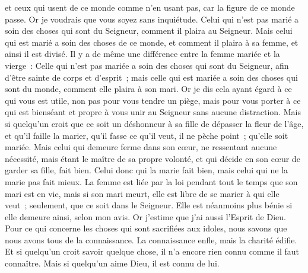 \begin{multicols}{2}
et ceux qui usent de ce monde comme n'en usant pas, car la figure de ce monde passe.
Or je voudrais que vous soyez sans inquiétude. Celui qui n'est pas marié a soin des choses qui sont du Seigneur, comment il plaira au Seigneur.
Mais celui qui est marié a soin des choses de ce monde, et comment il plaira à sa femme, et ainsi il est divisé.
Il y a de même une différence entre la femme mariée et la vierge~: Celle qui n'est pas mariée a soin des choses qui sont du Seigneur, afin d'être sainte de corps et d'esprit~; mais celle qui est mariée a soin des choses qui sont du monde, comment elle plaira à son mari.
Or je dis cela ayant égard à ce qui vous est utile, non pas pour vous tendre un piège, mais pour vous porter à ce qui est bienséant et propre à vous unir au Seigneur sans aucune distraction.
Mais si quelqu'un croit que ce soit un déshonneur à sa fille de dépasser la fleur de l'âge, et qu'il faille la marier, qu'il fasse ce qu'il veut, il ne pèche point~; qu'elle soit mariée.
Mais celui qui demeure ferme dans son cœur, ne ressentant aucune nécessité, mais étant le maître de sa propre volonté, et qui décide en son cœur de garder sa fille, fait bien.
Celui donc qui la marie fait bien, mais celui qui ne la marie pas fait mieux.
La femme est liée par la loi pendant tout le temps que son mari est en vie, mais si son mari meurt, elle est libre de se marier à qui elle veut~; seulement, que ce soit dans le Seigneur.
Elle est néanmoins plus bénie si elle demeure ainsi, selon mon avis. Or j'estime que j'ai aussi l'Esprit de Dieu.
\VerseOne{}Pour ce qui concerne les choses qui sont sacrifiées aux idoles, nous savons que nous avons tous de la connaissance. La connaissance enfle, mais la charité édifie.
Et si quelqu'un croit savoir quelque chose, il n'a encore rien connu comme il faut connaître.
Mais si quelqu'un aime Dieu, il est connu de lui.

\end{multicols}
